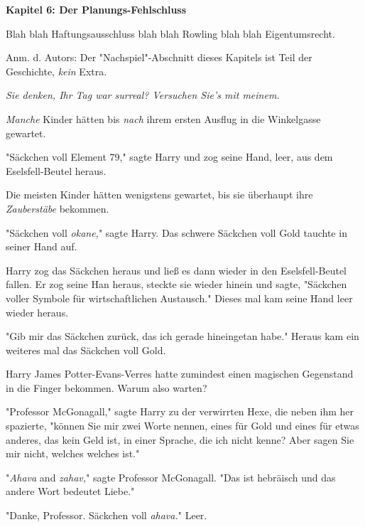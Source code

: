 

\hypertarget{der-planungs-fehlschluss}{%

\textbf{Kapitel 6: Der Planungs-Fehlschluss}

Blah blah Haftungsausschluss blah blah Rowling blah blah Eigentumsrecht.

Anm. d. Autors: Der "Nachspiel"-Abschnitt dieses Kapitels ist Teil der Geschichte, \emph{kein} Extra.

\later

\emph{Sie denken, Ihr Tag war surreal? Versuchen Sie's mit meinem.}

\later

\emph{Manche} Kinder hätten bis \emph{nach} ihrem ersten Ausflug in die Winkelgasse gewartet.

"Säckchen voll Element 79," sagte Harry und zog seine Hand, leer, aus dem Eselsfell-Beutel heraus.

Die meisten Kinder hätten wenigstens gewartet, bis sie überhaupt ihre \emph{Zauberstäbe} bekommen.

"Säckchen voll \emph{okane,}" sagte Harry. Das schwere Säckchen voll Gold tauchte in seiner Hand auf.

Harry zog das Säckchen heraus und ließ es dann wieder in den Eselsfell-Beutel fallen. Er zog seine Han heraus, steckte sie wieder hinein und sagte, "Säckchen voller Symbole für wirtschaftlichen Austausch." Dieses mal kam seine Hand leer wieder heraus.

"Gib mir das Säckchen zurück, das ich gerade hineingetan habe." Heraus kam ein weiteres mal das Säckchen voll Gold.

Harry James Potter-Evans-Verres hatte zumindest einen magischen Gegenstand in die Finger bekommen. Warum also warten?

"Professor McGonagall," sagte Harry zu der verwirrten Hexe, die neben ihm her spazierte, "können Sie mir zwei Worte nennen, eines für Gold und eines für etwas anderes, das kein Geld ist, in einer Sprache, die ich nicht kenne? Aber sagen Sie mir nicht, welches welches ist."

"\emph{Ahava} and \emph{zahav,}" sagte Professor McGonagall. "Das ist hebräisch und das andere Wort bedeutet Liebe."

"Danke, Professor. Säckchen voll \emph{ahava.}" Leer.

}
